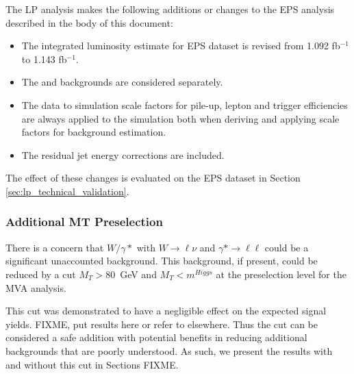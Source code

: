 
The LP analysis makes the following additions or changes to the EPS analysis
described in the body of this document:

\begin{itemize}
    \item The integrated luminosity estimate for EPS dataset is revised from 1.092 fb$^{-1}$ to 1.143 fb$^{-1}$.
    \item The \dytt and \dyll backgrounds are considered separately.
    \item The data to simulation scale factors for pile-up, lepton and trigger efficiencies are 
always applied to the simulation both when deriving and applying scale factors for background estimation.
    \item The residual jet energy corrections are included.
\end{itemize}

The effect of these changes is evaluated on the EPS dataset in Section \ref{sec:lp_technical_validation}.

\subsubsection{Additional MT Preselection}

There is a concern that $W/\gamma*$ with $W\rightarrow \ell\nu$ 
and $\gamma*\rightarrow\ell\ell$ could be a significant unaccounted background.
This background, if present, could be reduced by a cut $M_T > 80$~GeV and $M_T< m^{Higgs}$
at the preselection level for the MVA analysis.

This cut was demonstrated to have a negligible effect on the expected signal yields. 
FIXME, put results here or refer to elsewhere.
Thus the cut can be considered a safe addition with potential benefits in reducing 
additional backgrounds that are poorly understood. 
As such, we present the results with and without this cut in Sections FIXME.

